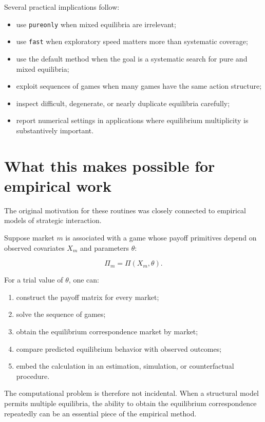\documentclass[11pt]{article}
\providecommand{\tightlist}{%
      \setlength{\itemsep}{0pt}\setlength{\parskip}{0pt}}
\begin{document}
Several practical implications follow:

\begin{itemize}
\tightlist
\item
  use \texttt{pureonly} when mixed equilibria are irrelevant;
\item
  use \texttt{fast} when exploratory speed matters more than systematic
  coverage;
\item
  use the default method when the goal is a systematic search for pure
  and mixed equilibria;
\item
  exploit sequences of games when many games have the same action
  structure;
\item
  inspect difficult, degenerate, or nearly duplicate equilibria
  carefully;
\item
  report numerical settings in applications where equilibrium
  multiplicity is substantively important.
\end{itemize}

    \section{What this makes possible for empirical
work}\label{what-this-makes-possible-for-empirical-work}

The original motivation for these routines was closely connected to
empirical models of strategic interaction.

Suppose market \(m\) is associated with a game whose payoff primitives
depend on observed covariates \(X_m\) and parameters \(\theta\):

\[
\Pi_m=\Pi(X_m,\theta).
\]

For a trial value of \(\theta\), one can:

\begin{enumerate}
\def\labelenumi{\arabic{enumi}.}
\tightlist
\item
  construct the payoff matrix for every market;
\item
  solve the sequence of games;
\item
  obtain the equilibrium correspondence market by market;
\item
  compare predicted equilibrium behavior with observed outcomes;
\item
  embed the calculation in an estimation, simulation, or counterfactual
  procedure.
\end{enumerate}

The computational problem is therefore not incidental. When a structural
model permits multiple equilibria, the ability to obtain the equilibrium
correspondence repeatedly can be an essential piece of the empirical
method.
\end{document}
